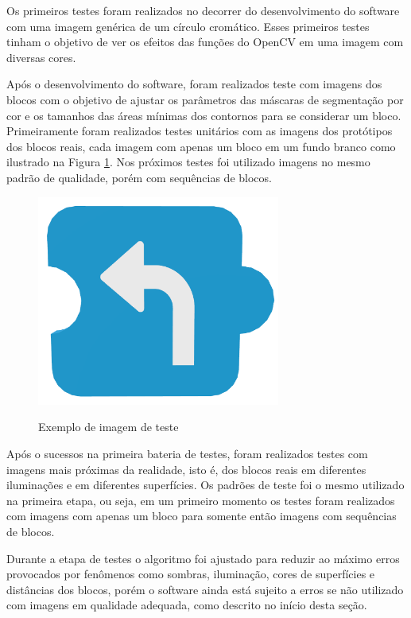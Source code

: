     Os primeiros testes foram realizados no decorrer do desenvolvimento do software com uma imagem genérica de um círculo cromático. Esses primeiros testes tinham o objetivo de ver os efeitos das funções do OpenCV em uma imagem com diversas cores.
    
    Após o desenvolvimento do software, foram realizados teste com imagens dos blocos com o objetivo de ajustar os parâmetros das máscaras de segmentação por cor e os tamanhos das áreas mínimas dos contornos para se considerar um bloco. Primeiramente foram realizados testes unitários com as imagens dos protótipos dos blocos reais, cada imagem com apenas um bloco em um fundo branco como ilustrado na Figura \ref{figura:ex_teste}. Nos próximos testes foi utilizado imagens no mesmo padrão de qualidade, porém com sequências de blocos.
       
    \begin{figure}[H]
        \caption{Exemplo de imagem de teste}
        \centering
        \includegraphics[width=8cm]{Imagens/Cap3/Blocos/Virar.png}
        \label{figura:ex_teste}
    \end{figure}
    
    Após o sucessos na primeira bateria de testes, foram realizados testes com imagens mais próximas da realidade, isto é, dos blocos reais em diferentes iluminações e em diferentes superfícies. Os padrões de teste foi o mesmo utilizado na primeira etapa, ou seja, em um primeiro momento os testes foram realizados com imagens com apenas um bloco para somente então imagens com sequências de blocos.
    
    Durante a etapa de testes o algoritmo foi ajustado para reduzir ao máximo erros provocados por fenômenos como sombras, iluminação, cores de superfícies e distâncias dos blocos, porém o software ainda está sujeito a erros se não utilizado com imagens em qualidade adequada, como descrito no início desta seção.    

